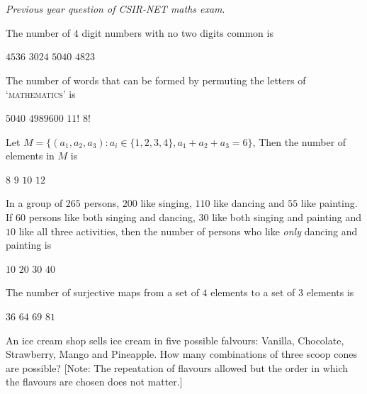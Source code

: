 \documentclass[10pt]{exam}
\begin{document}
 
\noindent \emph{Previous year question of CSIR-NET maths exam}. 
\begin{questions}
\question
The number of $4$ digit numbers with no two digits common is

\begin{oneparchoices}
\choice $4536$
\choice $3024$
\choice $5040$
\choice $4823$
\end{oneparchoices}
\question
The number of words that can be formed by permuting the letters of `\textsc{mathematics}' is 

\begin{oneparchoices}
\choice $5040$
\choice $4989600$
\choice $11!$
\choice $8!$  
\end{oneparchoices}



\question
Let $M=\{(a_1,a_2,a_3):a_i \in \{1,2,3,4\},a_1+a_2+a_3=6\}$, Then the number of elements in $M$ is

\begin{oneparchoices}
\choice $8$
\choice $9$
\choice $10$
\choice $12$  
\end{oneparchoices}

\question
In a group of $265$ persons, $200$ like singing, $110$ like dancing and $55$ like painting. If $60$ persons like both singing and dancing, $30$ like both singing and painting and $10$ like all three activities, then the number of persons who like \textit{only} dancing and painting is

\begin{oneparchoices}
\choice $10$
\choice $20$
\choice $30$
\choice $40$  
\end{oneparchoices}

\question
The number of surjective maps from a set of $4$ elements to a set of $3$ elements is

\begin{oneparchoices}
\choice $36$
\choice $64$
\choice $69$
\choice $81$  
\end{oneparchoices}

\question 
An ice cream shop sells ice cream in five possible falvours: Vanilla, Chocolate, Strawberry, Mango and Pineapple. How many combinations of three scoop cones are possible? [Note: The repeatation of flavours allowed but the order in which the flavours are chosen does not matter.]


\end{questions}
\end{document}
